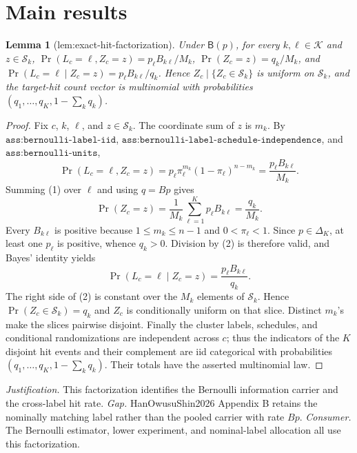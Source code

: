 \documentclass{article}
\newtheorem{lemma}{Lemma}
\begin{document}
\section{Main results}

\begin{lemma}[lem:exact-hit-factorization]\label{lem:exact-hit-factorization}
Under \(\mathsf B(p)\), for every \(k,\ell\in\mathcal K\) and \(z\in\mathcal S_k\), \(\Pr(L_c=\ell,Z_c=z)=p_\ell B_{k\ell}/M_k\), \(\Pr(Z_c=z)=q_k/M_k\), and \(\Pr(L_c=\ell\mid Z_c=z)=p_\ell B_{k\ell}/q_k\). Hence \(Z_c\mid\{Z_c\in\mathcal S_k\}\) is uniform on \(\mathcal S_k\), and the target-hit count vector is multinomial with probabilities \((q_1,\ldots,q_K,1-\sum_kq_k)\).
\end{lemma}
\begin{proof}
Fix \(c\), \(k\), \(\ell\), and \(z\in\mathcal S_k\).  The coordinate sum of \(z\) is \(m_k\).  By \(\texttt{ass:bernoulli-label-iid}\), \(\texttt{ass:bernoulli-label-schedule-independence}\), and \(\texttt{ass:bernoulli-units}\),
\[
 \Pr(L_c=\ell,Z_c=z)
 =p_\ell\pi_\ell^{m_k}(1-\pi_\ell)^{n-m_k}
 =\frac{p_\ell B_{k\ell}}{M_k}. \tag{1}
\]
Summing (1) over \(\ell\) and using \(q=Bp\) gives
\[
 \Pr(Z_c=z)=\frac1{M_k}\sum_{\ell=1}^Kp_\ell B_{k\ell}=\frac{q_k}{M_k}. \tag{2}
\]
Every \(B_{k\ell}\) is positive because \(1\leq m_k\leq n-1\) and \(0<\pi_\ell<1\).  Since \(p\in\Delta_K\), at least one \(p_\ell\) is positive, whence \(q_k>0\).  Division by (2) is therefore valid, and Bayes' identity yields
\[
 \Pr(L_c=\ell\mid Z_c=z)=\frac{p_\ell B_{k\ell}}{q_k}. \tag{3}
\]
The right side of (2) is constant over the \(M_k\) elements of \(\mathcal S_k\).  Hence \(\Pr(Z_c\in\mathcal S_k)=q_k\) and \(Z_c\) is conditionally uniform on that slice.  Distinct \(m_k\)'s make the slices pairwise disjoint.  Finally the cluster labels, schedules, and conditional randomizations are independent across \(c\); thus the indicators of the \(K\) disjoint hit events and their complement are iid categorical with probabilities \((q_1,\ldots,q_K,1-\sum_kq_k)\).  Their totals have the asserted multinomial law.
\end{proof}
\par\smallskip\noindent \textit{Justification.} This factorization identifies the Bernoulli information carrier and the cross-label hit rate. \textit{Gap.} HanOwusuShin2026 Appendix B retains the nominally matching label rather than the pooled carrier with rate \(Bp\). \textit{Consumer.} The Bernoulli estimator, lower experiment, and nominal-label allocation all use this factorization.
\end{document}
